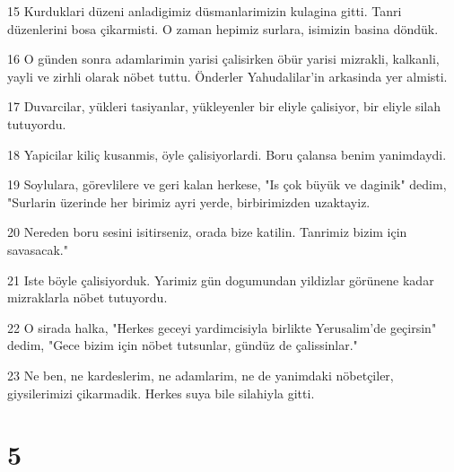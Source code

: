 \par 15 Kurduklari düzeni anladigimiz düsmanlarimizin kulagina gitti. Tanri düzenlerini bosa çikarmisti. O zaman hepimiz surlara, isimizin basina döndük.
\par 16 O günden sonra adamlarimin yarisi çalisirken öbür yarisi mizrakli, kalkanli, yayli ve zirhli olarak nöbet tuttu. Önderler Yahudalilar'in arkasinda yer almisti.
\par 17 Duvarcilar, yükleri tasiyanlar, yükleyenler bir eliyle çalisiyor, bir eliyle silah tutuyordu.
\par 18 Yapicilar kiliç kusanmis, öyle çalisiyorlardi. Boru çalansa benim yanimdaydi.
\par 19 Soylulara, görevlilere ve geri kalan herkese, "Is çok büyük ve daginik" dedim, "Surlarin üzerinde her birimiz ayri yerde, birbirimizden uzaktayiz.
\par 20 Nereden boru sesini isitirseniz, orada bize katilin. Tanrimiz bizim için savasacak."
\par 21 Iste böyle çalisiyorduk. Yarimiz gün dogumundan yildizlar görünene kadar mizraklarla nöbet tutuyordu.
\par 22 O sirada halka, "Herkes geceyi yardimcisiyla birlikte Yerusalim'de geçirsin" dedim, "Gece bizim için nöbet tutsunlar, gündüz de çalissinlar."
\par 23 Ne ben, ne kardeslerim, ne adamlarim, ne de yanimdaki nöbetçiler, giysilerimizi çikarmadik. Herkes suya bile silahiyla gitti.

\chapter{5}

